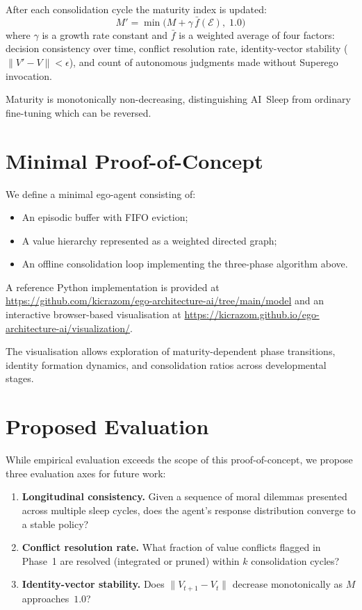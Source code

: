 \documentclass[11pt,a4paper]{article}
\begin{document}
After each consolidation cycle the maturity index is updated:
\begin{equation}
  M' = \min\!\bigl(M + \gamma\,\bar{f}(\mathcal{E}),\; 1.0\bigr)
  \label{eq:maturity}
\end{equation}
where $\gamma$ is a growth rate constant and $\bar{f}$ is a weighted
average of four factors: decision consistency over time, conflict
resolution rate, identity-vector stability
($\lVert V' - V\rVert < \epsilon$), and count of autonomous judgments
made without Superego invocation.

Maturity is monotonically non-decreasing, distinguishing AI~Sleep from
ordinary fine-tuning which can be reversed.

\section{Minimal Proof-of-Concept}
\label{sec:poc}

We define a minimal ego-agent consisting of:
\begin{itemize}
  \item An episodic buffer with FIFO eviction;
  \item A value hierarchy represented as a weighted directed graph;
  \item An offline consolidation loop implementing the three-phase
        algorithm above.
\end{itemize}

A reference Python implementation is provided at
\url{https://github.com/kicrazom/ego-architecture-ai/tree/main/model}
and an interactive browser-based visualisation at
\url{https://kicrazom.github.io/ego-architecture-ai/visualization/}.

The visualisation allows exploration of maturity-dependent phase
transitions, identity formation dynamics, and consolidation ratios
across developmental stages.

\section{Proposed Evaluation}
\label{sec:eval}

While empirical evaluation exceeds the scope of this proof-of-concept,
we propose three evaluation axes for future work:

\begin{enumerate}
  \item \textbf{Longitudinal consistency.}  Given a sequence of moral
        dilemmas presented across multiple sleep cycles, does the
        agent's response distribution converge to a stable policy?
  \item \textbf{Conflict resolution rate.}  What fraction of value
        conflicts flagged in Phase~1 are resolved (integrated or
        pruned) within $k$ consolidation cycles?
  \item \textbf{Identity-vector stability.}  Does
        $\lVert V_{t+1} - V_t \rVert$ decrease monotonically as $M$
        approaches~$1.0$?
\end{enumerate}
\end{document}

